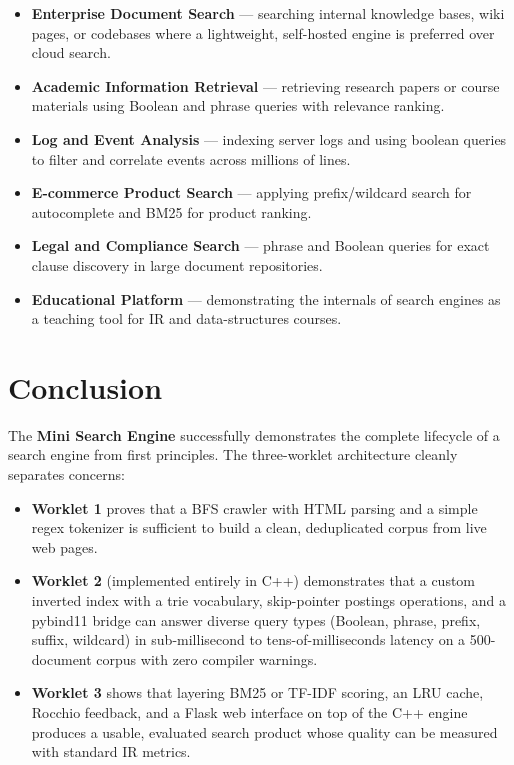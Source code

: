 \documentclass[12pt]{article}
\begin{document}
\begin{itemize}
    \item \textbf{Enterprise Document Search} --- searching internal knowledge bases, wiki pages, or codebases where a lightweight, self-hosted engine is preferred over cloud search.
    \item \textbf{Academic Information Retrieval} --- retrieving research papers or course materials using Boolean and phrase queries with relevance ranking.
    \item \textbf{Log and Event Analysis} --- indexing server logs and using boolean queries to filter and correlate events across millions of lines.
    \item \textbf{E-commerce Product Search} --- applying prefix/wildcard search for autocomplete and BM25 for product ranking.
    \item \textbf{Legal and Compliance Search} --- phrase and Boolean queries for exact clause discovery in large document repositories.
    \item \textbf{Educational Platform} --- demonstrating the internals of search engines as a teaching tool for IR and data-structures courses.
\end{itemize}

\section*{Conclusion}

The \textbf{Mini Search Engine} successfully demonstrates the complete lifecycle of a search engine from first principles. The three-worklet architecture cleanly separates concerns:

\begin{itemize}
    \item \textbf{Worklet 1} proves that a BFS crawler with HTML parsing and a simple regex tokenizer is sufficient to build a clean, deduplicated corpus from live web pages.
    \item \textbf{Worklet 2} (implemented entirely in C++) demonstrates that a custom inverted index with a trie vocabulary, skip-pointer postings operations, and a pybind11 bridge can answer diverse query types (Boolean, phrase, prefix, suffix, wildcard) in sub-millisecond to tens-of-milliseconds latency on a 500-document corpus with zero compiler warnings.
    \item \textbf{Worklet 3} shows that layering BM25 or TF-IDF scoring, an LRU cache, Rocchio feedback, and a Flask web interface on top of the C++ engine produces a usable, evaluated search product whose quality can be measured with standard IR metrics.
\end{itemize}
\end{document}
